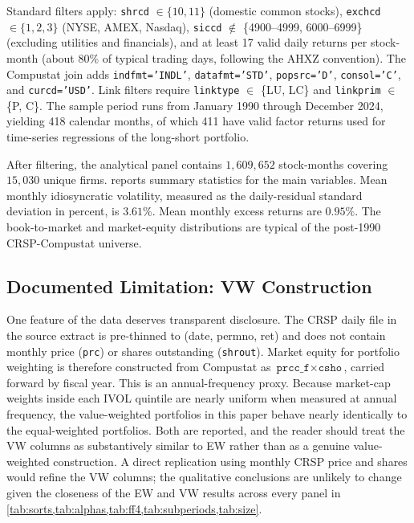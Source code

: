 \documentclass[12pt]{article}
\newcommand{\1}[1]{\mathds{1}\left[#1\right]}
\begin{document}
Standard filters apply: \texttt{shrcd} $\in \{10, 11\}$ (domestic common
stocks), \texttt{exchcd} $\in \{1, 2, 3\}$ (NYSE, AMEX, Nasdaq),
\texttt{siccd} $\notin$ \{4900--4999, 6000--6999\} (excluding utilities and
financials), and at least 17 valid daily returns per stock-month (about 80\%
of typical trading days, following the AHXZ convention). The Compustat join
adds \texttt{indfmt='INDL'}, \texttt{datafmt='STD'}, \texttt{popsrc='D'},
\texttt{consol='C'}, and \texttt{curcd='USD'}. Link filters require
\texttt{linktype} $\in$ \{LU, LC\} and \texttt{linkprim} $\in$ \{P, C\}. The
sample period runs from January 1990 through December 2024, yielding 418
calendar months, of which 411 have valid factor returns used for time-series
regressions of the long-short portfolio.

After filtering, the analytical panel contains $1{,}609{,}652$ stock-months
covering $15{,}030$ unique firms.  reports summary
statistics for the main variables. Mean monthly idiosyncratic volatility,
measured as the daily-residual standard deviation in percent, is $3.61\%$.
Mean monthly excess returns are $0.95\%$. The book-to-market and market-equity
distributions are typical of the post-1990 CRSP-Compustat universe.

\subsection{Documented Limitation: VW Construction}

One feature of the data deserves transparent disclosure. The CRSP daily file
in the source extract is pre-thinned to (date, permno, ret) and does not
contain monthly price (\texttt{prc}) or shares outstanding (\texttt{shrout}).
Market equity for portfolio weighting is therefore constructed from Compustat
as $\texttt{prcc\_f} \times \texttt{csho}$, carried forward by fiscal year.
This is an annual-frequency proxy. Because market-cap weights inside each
IVOL quintile are nearly uniform when measured at annual frequency, the
value-weighted portfolios in this paper behave nearly identically to the
equal-weighted portfolios. Both are reported, and the reader should treat the
VW columns as substantively similar to EW rather than as a genuine value-weighted
construction. A direct replication using monthly CRSP price and shares would
refine the VW columns; the qualitative conclusions are unlikely to change
given the closeness of the EW and VW results across every panel in
\cref{tab:sorts,tab:alphas,tab:ff4,tab:subperiods,tab:size}.
\end{document}
